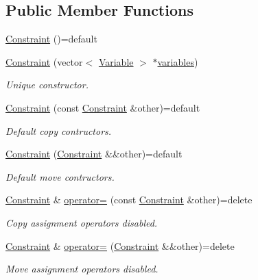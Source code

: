 \subsection*{Public Member Functions}
\begin{DoxyCompactItemize}
\item 
\hyperlink{classghost_1_1Constraint_a9632dde3e9486686466f1692706af5d9}{Constraint} ()=default
\item 
\hyperlink{classghost_1_1Constraint_a2b66b2953a7b3d81e6f215ea4e5e0294}{Constraint} (vector$<$ \hyperlink{classghost_1_1Variable}{Variable} $>$ $\ast$\hyperlink{classghost_1_1Constraint_a1730b1b54d03d221e6e2a95185a2184b}{variables})
\begin{DoxyCompactList}\small\item\em Unique constructor. \end{DoxyCompactList}\item 
\hyperlink{classghost_1_1Constraint_a12f4e85434d02d6fe0a2a95fa7ff6a56}{Constraint} (const \hyperlink{classghost_1_1Constraint}{Constraint} \&other)=default
\begin{DoxyCompactList}\small\item\em Default copy contructors. \end{DoxyCompactList}\item 
\hyperlink{classghost_1_1Constraint_af90f09c362cb7eea3f92ed2814f26f20}{Constraint} (\hyperlink{classghost_1_1Constraint}{Constraint} \&\&other)=default
\begin{DoxyCompactList}\small\item\em Default move contructors. \end{DoxyCompactList}\item 
\hyperlink{classghost_1_1Constraint}{Constraint} \& \hyperlink{classghost_1_1Constraint_a002177e11deecee2db240c9ff4647008}{operator=} (const \hyperlink{classghost_1_1Constraint}{Constraint} \&other)=delete
\begin{DoxyCompactList}\small\item\em Copy assignment operators disabled. \end{DoxyCompactList}\item 
\hyperlink{classghost_1_1Constraint}{Constraint} \& \hyperlink{classghost_1_1Constraint_a2d220b6c65e9c5456bdbc49944a0b52c}{operator=} (\hyperlink{classghost_1_1Constraint}{Constraint} \&\&other)=delete
\begin{DoxyCompactList}\small\item\em Move assignment operators disabled. \end{DoxyCompactList}\item 

\end{DoxyCompactItemize}
